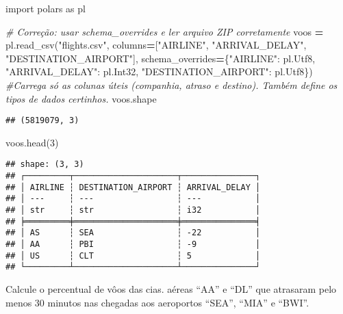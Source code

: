 \documentclass[
]{article}
\newenvironment{Shaded}{\begin{snugshade}}{\end{snugshade}}
\newcommand{\CommentTok}[1]{\textcolor[rgb]{0.56,0.35,0.01}{\textit{#1}}}
\newcommand{\DecValTok}[1]{\textcolor[rgb]{0.00,0.00,0.81}{#1}}
\newcommand{\ImportTok}[1]{#1}
\newcommand{\NormalTok}[1]{#1}
\newcommand{\OperatorTok}[1]{\textcolor[rgb]{0.81,0.36,0.00}{\textbf{#1}}}
\newcommand{\StringTok}[1]{\textcolor[rgb]{0.31,0.60,0.02}{#1}}
\begin{document}
\begin{Shaded}
\begin{Highlighting}[]
\ImportTok{import}\NormalTok{ polars }\ImportTok{as}\NormalTok{ pl}

\CommentTok{\# Correção: usar schema\_overrides e ler arquivo ZIP corretamente}
\NormalTok{voos }\OperatorTok{=}\NormalTok{ pl.read\_csv(}\StringTok{"flights.csv"}\NormalTok{,}
\NormalTok{                   columns}\OperatorTok{=}\NormalTok{[}\StringTok{"AIRLINE"}\NormalTok{, }\StringTok{"ARRIVAL\_DELAY"}\NormalTok{, }\StringTok{"DESTINATION\_AIRPORT"}\NormalTok{],}
\NormalTok{                   schema\_overrides}\OperatorTok{=}\NormalTok{\{}\StringTok{"AIRLINE"}\NormalTok{: pl.Utf8,}
                                    \StringTok{"ARRIVAL\_DELAY"}\NormalTok{: pl.Int32,}
                                    \StringTok{"DESTINATION\_AIRPORT"}\NormalTok{: pl.Utf8\}) }\CommentTok{\#Carrega só as colunas úteis (companhia, atraso e destino). Também define os tipos de dados certinhos.}
\NormalTok{voos.shape}
\end{Highlighting}
\end{Shaded}

\begin{verbatim}
## (5819079, 3)
\end{verbatim}

\begin{Shaded}
\begin{Highlighting}[]
\NormalTok{voos.head(}\DecValTok{3}\NormalTok{) }
\end{Highlighting}
\end{Shaded}

\begin{verbatim}
## shape: (3, 3)
## ┌─────────┬─────────────────────┬───────────────┐
## │ AIRLINE ┆ DESTINATION_AIRPORT ┆ ARRIVAL_DELAY │
## │ ---     ┆ ---                 ┆ ---           │
## │ str     ┆ str                 ┆ i32           │
## ╞═════════╪═════════════════════╪═══════════════╡
## │ AS      ┆ SEA                 ┆ -22           │
## │ AA      ┆ PBI                 ┆ -9            │
## │ US      ┆ CLT                 ┆ 5             │
## └─────────┴─────────────────────┴───────────────┘
\end{verbatim}

Calcule o percentual de vôos das cias. aéreas ``AA'' e ``DL'' que
atrasaram pelo menos 30 minutos nas chegadas aos aeroportos ``SEA'',
``MIA'' e ``BWI''.
\end{document}
